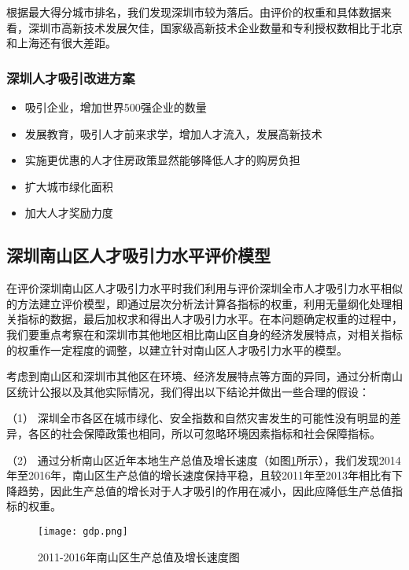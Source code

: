 \documentclass[withoutpreface,bwprint]{cumcmthesis} %
\begin{document}
根据最大得分城市排名，我们发现深圳市较为落后。由评价的权重和具体数据来看，深圳市高新技术发展欠佳，国家级高新技术企业数量和专利授权数相比于北京和上海还有很大差距。
\newpage
\subsubsection{深圳人才吸引改进方案}

\begin{itemize}
\item 吸引企业，增加世界500强企业的数量
\item 发展教育，吸引人才前来求学，增加人才流入，发展高新技术
\item 实施更优惠的人才住房政策显然能够降低人才的购房负担
\item 扩大城市绿化面积
\item 加大人才奖励力度
\end{itemize}




\subsection{深圳南山区人才吸引力水平评价模型}
在评价深圳南山区人才吸引力水平时我们利用与评价深圳全市人才吸引力水平相似的方法建立评价模型，即通过层次分析法计算各指标的权重，利用无量纲化处理相关指标的数据，最后加权求和得出人才吸引力水平。在本问题确定权重的过程中，我们要重点考察在和深圳市其他地区相比南山区自身的经济发展特点，对相关指标的权重作一定程度的调整，以建立针对南山区人才吸引力水平的模型。

考虑到南山区和深圳市其他区在环境、经济发展特点等方面的异同，通过分析南山区统计公报以及其他实际情况，我们得出以下结论并做出一些合理的假设：

（1）	深圳全市各区在城市绿化、安全指数和自然灾害发生的可能性没有明显的差异，各区的社会保障政策也相同，所以可忽略环境因素指标和社会保障指标。

（2）	通过分析南山区近年本地生产总值及增长速度（如图\ref{tab:2011-2016年南山区生产总值及增长速度图}所示），我们发现2014年至2016年，南山区生产总值的增长速度保持平稳，且较2011年至2013年相比有下降趋势，因此生产总值的增长对于人才吸引的作用在减小，因此应降低生产总值指标的权重。
\begin{figure}[!h]
\centering
\texttt{[image: gdp.png]}
\caption{2011-2016年南山区生产总值及增长速度图}
\label{tab:2011-2016年南山区生产总值及增长速度图}
\end{figure}
 
      
\end{document}
